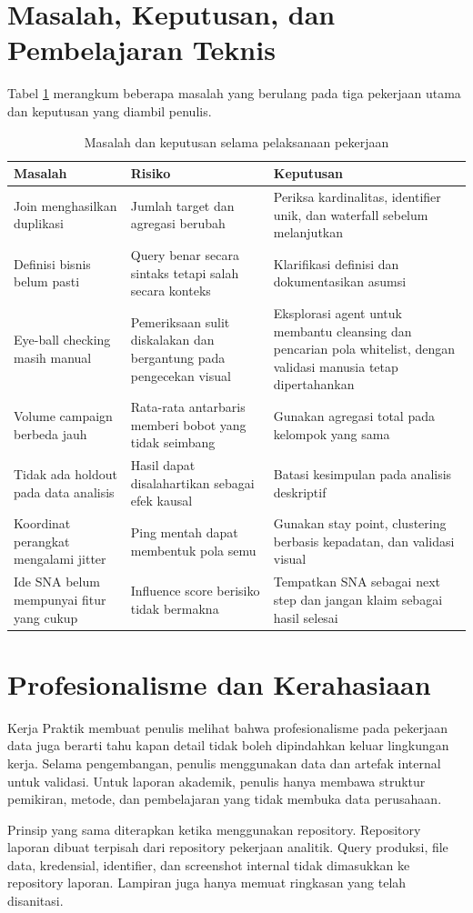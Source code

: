 \section{Masalah, Keputusan, dan Pembelajaran Teknis}
Tabel \ref{tab:masalah-keputusan} merangkum beberapa masalah yang berulang pada tiga pekerjaan utama dan keputusan yang diambil penulis.

\begin{table}[htbp]
\caption{Masalah dan keputusan selama pelaksanaan pekerjaan}
\label{tab:masalah-keputusan}
\centering
\begin{tabularx}{\textwidth}{|p{}|p{}|X|}
\hline
\textbf{Masalah} & \textbf{Risiko} & \textbf{Keputusan} \\
\hline
Join menghasilkan duplikasi & Jumlah target dan agregasi berubah & Periksa kardinalitas, identifier unik, dan waterfall sebelum melanjutkan \\
\hline
Definisi bisnis belum pasti & Query benar secara sintaks tetapi salah secara konteks & Klarifikasi definisi dan dokumentasikan asumsi \\
\hline
Eye-ball checking masih manual & Pemeriksaan sulit diskalakan dan bergantung pada pengecekan visual & Eksplorasi agent untuk membantu cleansing dan pencarian pola whitelist, dengan validasi manusia tetap dipertahankan \\
\hline
Volume campaign berbeda jauh & Rata-rata antarbaris memberi bobot yang tidak seimbang & Gunakan agregasi total pada kelompok yang sama \\
\hline
Tidak ada holdout pada data analisis & Hasil dapat disalahartikan sebagai efek kausal & Batasi kesimpulan pada analisis deskriptif \\
\hline
Koordinat perangkat mengalami jitter & Ping mentah dapat membentuk pola semu & Gunakan stay point, clustering berbasis kepadatan, dan validasi visual \\
\hline
Ide SNA belum mempunyai fitur yang cukup & Influence score berisiko tidak bermakna & Tempatkan SNA sebagai next step dan jangan klaim sebagai hasil selesai \\
\hline
\end{tabularx}
\end{table}

\section{Profesionalisme dan Kerahasiaan}
Kerja Praktik membuat penulis melihat bahwa profesionalisme pada pekerjaan data juga berarti tahu kapan detail tidak boleh dipindahkan keluar lingkungan kerja. Selama pengembangan, penulis menggunakan data dan artefak internal untuk validasi. Untuk laporan akademik, penulis hanya membawa struktur pemikiran, metode, dan pembelajaran yang tidak membuka data perusahaan.

Prinsip yang sama diterapkan ketika menggunakan repository. Repository laporan dibuat terpisah dari repository pekerjaan analitik. Query produksi, file data, kredensial, identifier, dan screenshot internal tidak dimasukkan ke repository laporan. Lampiran juga hanya memuat ringkasan yang telah disanitasi.
